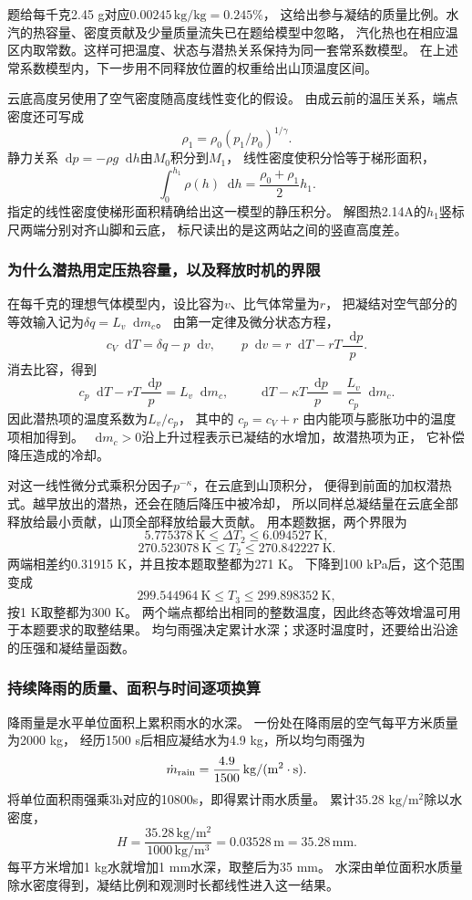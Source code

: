 \documentclass[UTF8,fontset=fandol,a4paper,11pt]{ctexart}
\newcommand{\dd}{\mathop{}\!\mathrm{d}}
\begin{document}
题给每千克2.45 g对应$0.00245\,\mathrm{kg/kg}=0.245\%$，
这给出参与凝结的质量比例。水汽的热容量、密度贡献及少量质量流失已在题给模型中忽略，
汽化热也在相应温区内取常数。这样可把温度、状态与潜热关系保持为同一套常系数模型。
在上述常系数模型内，下一步用不同释放位置的权重给出山顶温度区间。

云底高度另使用了空气密度随高度线性变化的假设。
由成云前的温压关系，端点密度还可写成
\[
\rho_1=\rho_0(p_1/p_0)^{1/\gamma}.
\]
静力关系$\dd p=-\rho g\dd h$由$M_0$积分到$M_1$，
线性密度使积分恰等于梯形面积，
\[
\int_0^{h_1}\rho(h)\dd h
=\frac{\rho_0+\rho_1}{2}h_1.
\]
指定的线性密度使梯形面积精确给出这一模型的静压积分。
解图热2.14A的$h_1$竖标尺两端分别对齐山脚和云底，
标尺读出的是这两站之间的竖直高度差。

\subsubsection*{为什么潜热用定压热容量，以及释放时机的界限}
在每千克的理想气体模型内，设比容为$v$、比气体常量为$r$，
把凝结对空气部分的等效输入记为$\delta q=L_v\dd m_c$。
由第一定律及微分状态方程，
\[
c_V\dd T=\delta q-p\dd v,\qquad
p\dd v=r\dd T-rT\frac{\dd p}{p}.
\]
消去比容，得到
\[
c_p\dd T-rT\frac{\dd p}{p}=L_v\dd m_c,\qquad
\dd T-\kappa T\frac{\dd p}{p}=\frac{L_v}{c_p}\dd m_c.
\]
因此潜热项的温度系数为$L_v/c_p$，
其中的 $c_p=c_V+r$ 由内能项与膨胀功中的温度项相加得到。
$\dd m_c>0$沿上升过程表示已凝结的水增加，故潜热项为正，
它补偿降压造成的冷却。

对这一线性微分式乘积分因子$p^{-\kappa}$，在云底到山顶积分，
便得到前面的加权潜热式。越早放出的潜热，还会在随后降压中被冷却，
所以同样总凝结量在云底全部释放给最小贡献，山顶全部释放给最大贡献。
用本题数据，两个界限为
\[
5.775378\ \mathrm K\le\Delta T_2\le6.094527\ \mathrm K,
\]
\[
270.523078\ \mathrm K\le T_2\le270.842227\ \mathrm K.
\]
两端相差约0.31915 K，并且按本题取整都为271 K。
下降到100 kPa后，这个范围变成
\[
299.544964\ \mathrm K\le T_3\le299.898352\ \mathrm K,
\]
按1 K取整都为300 K。
两个端点都给出相同的整数温度，因此终态等效增温可用于本题要求的取整结果。
均匀雨强决定累计水深；求逐时温度时，还要给出沿途的压强和凝结量函数。

\subsubsection*{持续降雨的质量、面积与时间逐项换算}
降雨量是水平单位面积上累积雨水的水深。
一份处在降雨层的空气每平方米质量为2000 kg，
经历1500 s后相应凝结水为4.9 kg，所以均匀雨强为
\[
\dot m_{\rm rain}=\frac{4.9}{1500}
\,\mathrm{kg/(m^2\cdot s)}.
\]
将单位面积雨强乘3h对应的10800s，即得累计雨水质量。
累计35.28 $\mathrm{kg/m^2}$除以水密度，
\[
H=\frac{35.28\,\mathrm{kg/m^2}}{1000\,\mathrm{kg/m^3}}
=0.03528\,\mathrm m=35.28\,\mathrm{mm}.
\]
每平方米增加1 kg水就增加1 mm水深，取整后为35 mm。
水深由单位面积水质量除水密度得到，凝结比例和观测时长都线性进入这一结果。
\end{document}
